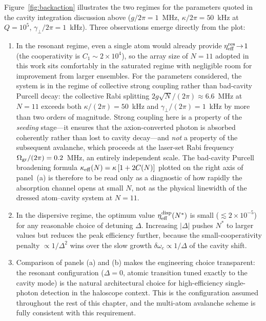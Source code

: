 Figure~\ref{fig:backaction} illustrates the two regimes for the parameters quoted in the cavity integration discussion above ($g/2\pi\!=\!1$~MHz, $\kappa/2\pi\!=\!50$~kHz at $Q\!=\!10^5$, $\gamma_\perp/2\pi\!=\!1$~kHz). Three observations emerge directly from the plot:

\begin{enumerate}
    \item In the resonant regime, even a single atom would already provide $\eta_{\rm eff}^{\rm res}\!\to\!1$ (the cooperativity is $C_1\!\sim\!2\!\times\!10^4$), so the array size of $N\!=\!11$ adopted in this work sits comfortably in the saturated regime with negligible room for improvement from larger ensembles. For the parameters considered, the system is in the regime of collective strong coupling rather than bad-cavity Purcell decay: the collective Rabi splitting $2g\sqrt{N}/(2\pi) \approx 6.6$~MHz at $N = 11$ exceeds both $\kappa/(2\pi) = 50$~kHz and $\gamma_\perp/(2\pi) = 1$~kHz by more than two orders of magnitude. Strong coupling here is a property of the \emph{seeding} stage---it ensures that the axion-converted photon is absorbed coherently rather than lost to cavity decay---and \emph{not} a property of the subsequent avalanche, which proceeds at the laser-set Rabi frequency $\Omega_{\rm gr}/(2\pi) = 0.2$~MHz, an entirely independent scale. The bad-cavity Purcell broadening formula $\kappa_{\rm eff}(N) = \kappa\,[1+2C(N)]$ plotted on the right axis of panel~(a) is therefore to be read only as a diagnostic of how rapidly the absorption channel opens at small $N$, not as the physical linewidth of the dressed atom--cavity system at $N = 11$.
    \item In the dispersive regime, the optimum value $\eta_{\rm eff}^{\rm disp}(N^*)$ is small ($\lesssim\!2\times10^{-5}$) for any reasonable choice of detuning $\Delta$. Increasing $|\Delta|$ pushes $N^*$ to larger values but reduces the peak efficiency further, because the small-cooperativity penalty $\propto 1/\Delta^2$ wins over the slow growth $\delta\omega_c\!\propto\!1/\Delta$ of the cavity shift.
    \item Comparison of panels (a) and (b) makes the engineering choice transparent: the resonant configuration ($\Delta = 0$, atomic transition tuned exactly to the cavity mode) is the natural architectural choice for high-efficiency single-photon detection in the haloscope context. This is the configuration assumed throughout the rest of this chapter, and the multi-atom avalanche scheme is fully consistent with this requirement.
\end{enumerate}

